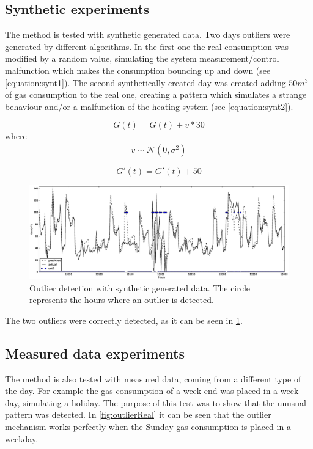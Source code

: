 \documentclass{sig-alternate-sigmod07}
\begin{document}
\subsection{Synthetic experiments}
The method is tested with synthetic generated data. Two days outliers were generated by different algorithms. In the first one the real consumption was modified by a random value, simulating the system measurement/control malfunction which makes the consumption bouncing up and down (see \cref{equation:synt1}). The second synthetically created day was created adding $50 m^3$ of gas consumption to the real one, creating a pattern which simulates a strange behaviour and/or a malfunction of the heating system (see \cref{equation:synt2}).

\begin{equation}G(t)= G(t)+v*30\label{equation:synt1} \end{equation}
where 
\begin{align*}v \sim \mathcal{N} (0,\sigma^2) \end{align*}

\begin{equation}G'(t)= G'(t)+50\label{equation:synt2} \end{equation}

\begin{figure}
\centering
\includegraphics[width=\textwidth]{images/outliersSynt.eps}
\caption{Outlier detection with synthetic generated data. The circle represents the hours where an outlier is detected.}
\label{fig:outlierSynt}
\end{figure}

The two outliers were correctly detected, as it can be seen in \cref{fig:outlierSynt}.


\subsection{Measured data experiments}
The method is also tested with measured data, coming from a different type of the day. For example the gas consumption of a week-end was placed in a week-day, simulating a holiday. The purpose of this test was to show that the unusual pattern was detected. In \cref{fig:outlierReal} it can be seen that the outlier mechanism works perfectly when the Sunday gas consumption is placed in a weekday. 
\end{document}

